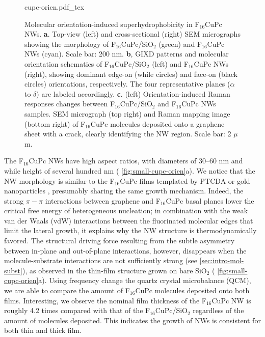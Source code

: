 \begin{figure}[htbp]
\centering
{cupc-orien.pdf_tex}
\caption{\label{fig:small-cupc-orien} Molecular orientation-induced
  superhydrophobicity in F$_{16}$CuPc NWs.  \textbf{a}. Top-view
  (left) and cross-sectional (right) SEM micrographs showing the
  morphology of F\(_{\text{16}}\)CuPc/SiO\(_{\text{2}}\) (green) and
  F\(_{\text{16}}\)CuPc NWs (cyan). Scale bar: 200 nm. \textbf{b},
  GIXD patterns and molecular orientation schematics of
  F\(_{\text{16}}\)CuPc/SiO\(_{\text{2}}\) (left) and
  F\(_{\text{16}}\)CuPc NWs (right), showing dominant edge-on (while
  circles) and face-on (black circles) orientations, respectively. The
  four representative planes (\(\alpha\) to \(\delta\)) are labeled
  accordingly. \textbf{c}. (left) Orientation-induced Raman responses
  changes between F$_{16}$CuPc/SiO$_{2}$ and F$_{16}$CuPc NWs samples.
  SEM micrograph (top right) and Raman mapping image (bottom right) of
  F\(_{\text{16}}\)CuPc molecules deposited onto a graphene sheet with
  a crack, clearly identifying the NW region. Scale bar: 2 \(\mu\)m. }
\end{figure}

The F\(_{\text{16}}\)CuPc NWs have high aspect ratios, with diameters
of 30--60 nm and while height of several hundred nm (
\autoref{fig:small-cupc-orien}a).
%
We notice that the NW morphology is similar to the
F\(_{\text{16}}\)CuPc films templated by PTCDA
\autocite{Yang_2009_F16_PTCDA} or gold nanoparticles
\autocite{Mbenkum_2006_F16_1D}, presumably sharing the same growth
mechanism.
%
Indeed, the strong \(\pi-\pi\) interactions between
graphene and F\(_{\text{16}}\)CuPc basal planes lower the critical
free energy of heterogeneous nucleation; in combination with the weak
van der Waals (vdW) interactions between the fluorinated molecular
edges that limit the lateral growth, it explains why the NW structure
is thermo\-dynamically favored.
%
The structural driving force resulting from the subtle asymmetry
between in-plane and out-of-plane interactions, however, disappears
when the molecule-substrate interactions are not sufficiently strong
(see \autoref{sec:intro-mol-subst}), as observed in the thin-film
structure grown on bare SiO\(_{\text{2}}\) (
\autoref{fig:small-cupc-orien}a).
%
Using frequency change  the quartz crystal
micro\-balance (QCM), we are able to compare the amount of
F$_{\mathrm{16}}$CuPc molecules deposited onto both
films. Interesting, we observe the nominal film thickness of the
F\(_{\text{16}}\)CuPc NW is roughly 4.2 times compared with that of
the F\(_{\text{16}}\)CuPc/SiO\(_{\text{2}}\) regardless of the amount
of molecules deposited. This indicates the growth of NWs is consistent
for both thin and thick film.

